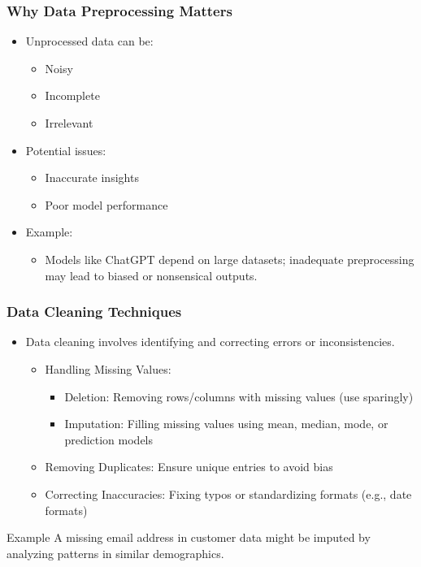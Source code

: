 \documentclass[aspectratio=169]{beamer}
\begin{document}
\begin{frame}[fragile]
    \frametitle{Why Data Preprocessing Matters}
    \begin{itemize}
        \item Unprocessed data can be:
        \begin{itemize}
            \item Noisy
            \item Incomplete
            \item Irrelevant
        \end{itemize}
        \item Potential issues:
        \begin{itemize}
            \item Inaccurate insights
            \item Poor model performance
        \end{itemize}
        \item Example:
        \begin{itemize}
            \item Models like ChatGPT depend on large datasets;
            inadequate preprocessing may lead to biased or nonsensical outputs.
        \end{itemize}
    \end{itemize}
\end{frame}

\begin{frame}[fragile]
    \frametitle{Data Cleaning Techniques}
    \begin{itemize}
        \item Data cleaning involves identifying and correcting errors or inconsistencies.
        \begin{itemize}
            \item Handling Missing Values:
            \begin{itemize}
                \item Deletion: Removing rows/columns with missing values (use sparingly)
                \item Imputation: Filling missing values using mean, median, mode, or prediction models
            \end{itemize}
            \item Removing Duplicates: Ensure unique entries to avoid bias
            \item Correcting Inaccuracies: Fixing typos or standardizing formats (e.g., date formats)
        \end{itemize}
    \end{itemize}
    \begin{block}{Example}
        A missing email address in customer data might be imputed by analyzing patterns in similar demographics.
    \end{block}
\end{frame}
\end{document}
